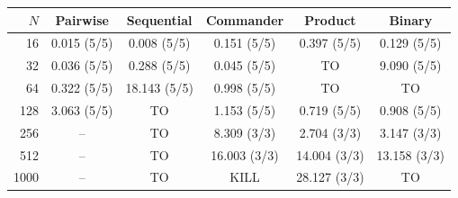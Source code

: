 \begin{tabular}{rccccc}
\toprule
$N$ & Pairwise & Sequential & Commander & Product & Binary \\
\midrule
16 & 0.015 (5/5) & 0.008 (5/5) & 0.151 (5/5) & 0.397 (5/5) & 0.129 (5/5) \\
32 & 0.036 (5/5) & 0.288 (5/5) & 0.045 (5/5) & TO & 9.090 (5/5) \\
64 & 0.322 (5/5) & 18.143 (5/5) & 0.998 (5/5) & TO & TO \\
128 & 3.063 (5/5) & TO & 1.153 (5/5) & 0.719 (5/5) & 0.908 (5/5) \\
256 & -- & TO & 8.309 (3/3) & 2.704 (3/3) & 3.147 (3/3) \\
512 & -- & TO & 16.003 (3/3) & 14.004 (3/3) & 13.158 (3/3) \\
1000 & -- & TO & KILL & 28.127 (3/3) & TO \\
\bottomrule
\end{tabular}
